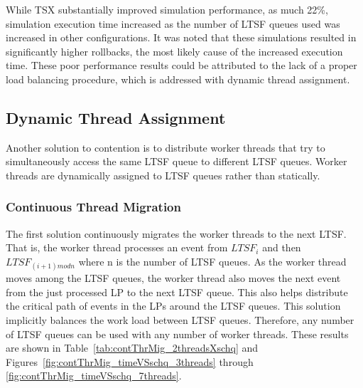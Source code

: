 \documentclass[11pt]{book}
\begin{document}
While TSX substantially improved simulation performance, as much 22\%,
simulation execution time increased as the number of LTSF queues used was
increased in other configurations.  It was noted that these simulations resulted
in significantly higher rollbacks, the most likely cause of the increased
execution time.  These poor performance results could be attributed to the lack
of a proper load balancing procedure, which is addressed with dynamic thread
assignment.

\subsection{Dynamic Thread Assignment}

Another solution to contention is to distribute worker threads that try to simultaneously
access the same LTSF queue to different LTSF queues.  Worker threads are dynamically
assigned to LTSF queues rather than statically.

\subsubsection{Continuous Thread Migration}

The first solution continuously migrates the worker threads to the next LTSF.  That is, the
worker thread processes an event from $LTSF_i$ and then $LTSF_{(i+1)mod n}$ where n is the
number of LTSF queues.  As the worker thread moves among the LTSF queues, the worker
thread also moves the next event from the just processed LP to the next LTSF queue.  This
also helps distribute the critical path of events in the LPs around the LTSF queues.  This
solution implicitly balances the work load between LTSF queues.  Therefore, any number of
LTSF queues can be used with any number of worker threads.  These results are shown in
Table~\ref{tab:contThrMig_2threadsXschq} and
Figures~\ref{fig:contThrMig_timeVSschq_3threads} through
\ref{fig:contThrMig_timeVSschq_7threads}.

\end{document}
